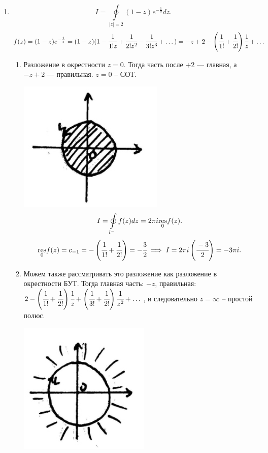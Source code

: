\documentclass[../../main.tex]{subfiles}
\begin{document}
	 \begin{examples}
	 	\begin{enumerate}
	 		\item 
	 		\[
	 		I=\oint\limits_{|z|=2}(1-z)e^{-\frac1z}dz.
	 		\]
	 		\[
	 		f(z)=(1-z)e^{-\frac1z}=(1-z)(1- \cfrac{1}{1!z} + \cfrac{1}{2!z^2}- 
	 		\cfrac{1}{3!z^3}+\dots)=-z+2-\left( \cfrac{1}{1!} + \cfrac{1}{2!}
	 		\right)\cfrac{1}{z}+\dots
	 		\]
	 		
	 		\begin{enumerate}
	 			\item Разложение в окрестности $z=0$. Тогда часть после $+2$ --- главная, 
	 			а $-z+2$ --- правильная. $z=0$ -- СОТ.
	 			
	 			\includegraphics{lec35_3}
	 			\[
	 			I=\oint\limits_{l^-}f(z)dz = 2\pi i \underset{0}{\operatorname{res}}f(z).
	 			\]
	 			\[
	 			\underset{0}{\operatorname{res}}f(z)=c_{-1}=-\left( \cfrac{1}{1!} + 
	 			\cfrac{1}{2!}\right)=
	 			-\cfrac{3}{2} \implies I=2\pi i \left( \cfrac{-3}{2}\right)=
	 			-3\pi i.
	 			\]
	 			\item Можем также рассматривать это разложение как разложение в 
	 			окрестности БУТ. Тогда главная часть: $-z$, правильная: 
	 			$2-\left( \cfrac{1}{1!} + \cfrac{1}{2!} \right)\cfrac{1}{z}+
	 			\left( \cfrac{1}{3!} + \cfrac{1}{2!} \right)\cfrac{1}{z^2}+\dots$, и 
	 			следовательно $z=\infty$ -- простой полюс.
	 			
	 			\includegraphics{lec35_4}
	 			

\end{enumerate}
\end{enumerate}
\end{examples}
\end{document}
